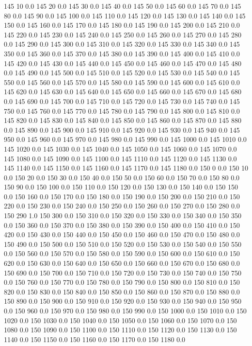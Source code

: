 145	10	0.0
145	20	0.0
145	30	0.0
145	40	0.0
145	50	0.0
145	60	0.0
145	70	0.0
145	80	0.0
145	90	0.0
145	100	0.0
145	110	0.0
145	120	0.0
145	130	0.0
145	140	0.0
145	150	0.0
145	160	0.0
145	170	0.0
145	180	0.0
145	190	0.0
145	200	0.0
145	210	0.0
145	220	0.0
145	230	0.0
145	240	0.0
145	250	0.0
145	260	0.0
145	270	0.0
145	280	0.0
145	290	0.0
145	300	0.0
145	310	0.0
145	320	0.0
145	330	0.0
145	340	0.0
145	350	0.0
145	360	0.0
145	370	0.0
145	380	0.0
145	390	0.0
145	400	0.0
145	410	0.0
145	420	0.0
145	430	0.0
145	440	0.0
145	450	0.0
145	460	0.0
145	470	0.0
145	480	0.0
145	490	0.0
145	500	0.0
145	510	0.0
145	520	0.0
145	530	0.0
145	540	0.0
145	550	0.0
145	560	0.0
145	570	0.0
145	580	0.0
145	590	0.0
145	600	0.0
145	610	0.0
145	620	0.0
145	630	0.0
145	640	0.0
145	650	0.0
145	660	0.0
145	670	0.0
145	680	0.0
145	690	0.0
145	700	0.0
145	710	0.0
145	720	0.0
145	730	0.0
145	740	0.0
145	750	0.0
145	760	0.0
145	770	0.0
145	780	0.0
145	790	0.0
145	800	0.0
145	810	0.0
145	820	0.0
145	830	0.0
145	840	0.0
145	850	0.0
145	860	0.0
145	870	0.0
145	880	0.0
145	890	0.0
145	900	0.0
145	910	0.0
145	920	0.0
145	930	0.0
145	940	0.0
145	950	0.0
145	960	0.0
145	970	0.0
145	980	0.0
145	990	0.0
145	1000	0.0
145	1010	0.0
145	1020	0.0
145	1030	0.0
145	1040	0.0
145	1050	0.0
145	1060	0.0
145	1070	0.0
145	1080	0.0
145	1090	0.0
145	1100	0.0
145	1110	0.0
145	1120	0.0
145	1130	0.0
145	1140	0.0
145	1150	0.0
145	1160	0.0
145	1170	0.0
145	1180	0.0
150	0	0.0
150	10	0.0
150	20	0.0
150	30	0.0
150	40	0.0
150	50	0.0
150	60	0.0
150	70	0.0
150	80	0.0
150	90	0.0
150	100	0.0
150	110	0.0
150	120	0.0
150	130	0.0
150	140	0.0
150	150	0.0
150	160	0.0
150	170	0.0
150	180	0.0
150	190	0.0
150	200	0.0
150	210	0.0
150	220	0.0
150	230	0.0
150	240	0.0
150	250	0.0
150	260	0.0
150	270	0.0
150	280	0.0
150	290	1.0
150	300	0.0
150	310	0.0
150	320	0.0
150	330	0.0
150	340	0.0
150	350	0.0
150	360	0.0
150	370	0.0
150	380	0.0
150	390	0.0
150	400	0.0
150	410	0.0
150	420	0.0
150	430	0.0
150	440	0.0
150	450	0.0
150	460	0.0
150	470	0.0
150	480	0.0
150	490	0.0
150	500	0.0
150	510	0.0
150	520	0.0
150	530	0.0
150	540	0.0
150	550	0.0
150	560	0.0
150	570	0.0
150	580	0.0
150	590	0.0
150	600	0.0
150	610	0.0
150	620	0.0
150	630	0.0
150	640	0.0
150	650	0.0
150	660	0.0
150	670	0.0
150	680	0.0
150	690	0.0
150	700	0.0
150	710	0.0
150	720	0.0
150	730	0.0
150	740	0.0
150	750	0.0
150	760	0.0
150	770	0.0
150	780	0.0
150	790	0.0
150	800	0.0
150	810	0.0
150	820	0.0
150	830	0.0
150	840	0.0
150	850	0.0
150	860	0.0
150	870	0.0
150	880	0.0
150	890	0.0
150	900	0.0
150	910	0.0
150	920	0.0
150	930	0.0
150	940	0.0
150	950	0.0
150	960	0.0
150	970	0.0
150	980	0.0
150	990	0.0
150	1000	0.0
150	1010	0.0
150	1020	0.0
150	1030	0.0
150	1040	0.0
150	1050	0.0
150	1060	0.0
150	1070	0.0
150	1080	0.0
150	1090	0.0
150	1100	0.0
150	1110	0.0
150	1120	0.0
150	1130	0.0
150	1140	0.0
150	1150	0.0
150	1160	0.0
150	1170	0.0
150	1180	0.0

